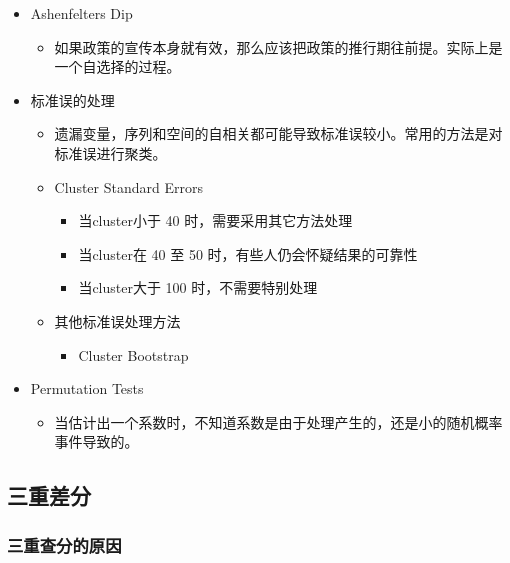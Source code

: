 \documentclass[11pt,a4paper]{ctexart}
\begin{document}
\begin{itemize}
\item
  Ashenfelter\textquotesingle s Dip

  \begin{itemize}
  \item
    如果政策的宣传本身就有效，那么应该把政策的推行期往前提。实际上是一个自选择的过程。
  \end{itemize}
\item
  标准误的处理

  \begin{itemize}
  \item
    遗漏变量，序列和空间的自相关都可能导致标准误较小。常用的方法是对标准误进行聚类。
  \end{itemize}

  \begin{itemize}
  \item
    Cluster Standard Errors

    \begin{itemize}
    \item
      当cluster小于 40 时，需要采用其它方法处理
    \item
      当cluster在 40 至 50 时，有些人仍会怀疑结果的可靠性
    \item
      当cluster大于 100 时，不需要特别处理
    \end{itemize}
  \end{itemize}

  \begin{itemize}
  \item
    其他标准误处理方法

    \begin{itemize}
    \item
      Cluster Bootstrap
    \end{itemize}
  \end{itemize}
\item
  Permutation Tests

  \begin{itemize}
  \item
    当估计出一个系数时，不知道系数是由于处理产生的，还是小的随机概率事件导致的。
  \end{itemize}
\end{itemize}

\subsection{三重差分}

\subsubsection{三重查分的原因}
\end{document}

